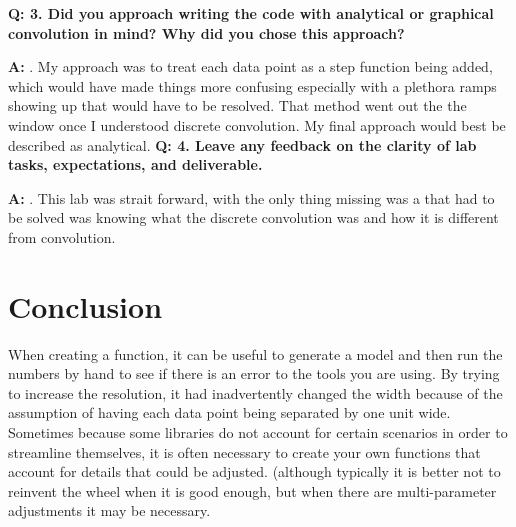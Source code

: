 \documentclass[12pt,a4paper]{article}
\newcommand{\Q}{\bigskip\bfseries Q: }
\newcommand{\A}{\par\textbf{A:} \normalfont}
\begin{document}
\Q 3. Did you approach writing the code with analytical or graphical
   convolution in mind? Why did you chose this approach?
\A 3. My approach was to treat each data point as a step function being added, which would have made things more confusing especially with a plethora ramps showing up that would have to be resolved.  That method went out the the window once I understood discrete convolution. My final approach would best be described as analytical.
\Q 4. Leave any feedback on the clarity of lab tasks, expectations, and deliverable.
\A 4.  This lab was strait forward, with the only thing missing was a that had to be solved was knowing what the discrete convolution was and how it is different from convolution.


\section{Conclusion}\label{sec:res}
When creating a function, it can be useful to generate a model and then run the numbers by hand to see if there is an error to the tools you are using.  By trying to increase the resolution, it had inadvertently changed the width because of the assumption of having each data point being separated by one unit wide.
Sometimes because some libraries do not account for certain scenarios in order to streamline themselves, it is often necessary to create your own functions that account for details that could be adjusted. (although typically it is better not to reinvent the wheel when it is good enough, but when there are multi-parameter adjustments it may be necessary.




\end{document}
